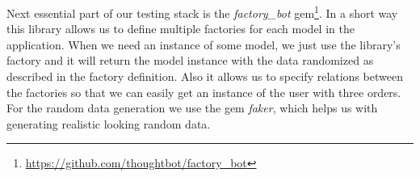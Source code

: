 Next essential part of our testing stack is  the \textit{factory\_bot} gem\footnote{\url{https://github.com/thoughtbot/factory_bot}}. In a short way this library allows us to define multiple factories for each model in the application. When we need an instance of some model, we just use the library's factory and it will return the model instance with the data randomized as described in the factory definition. Also it allows us to specify relations between the factories so that we can easily get an instance of the user with three orders.  For the random data generation we use the gem \textit{faker}, which helps us with generating realistic looking random data.